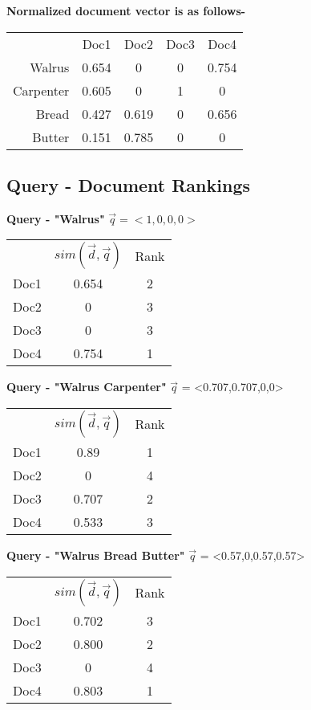 \documentclass{article}
\begin{document}
\vspace{5mm}
\textbf{Normalized document vector is as follows-}

\begin{tabular}{ r|c|c|c|c| }
\multicolumn{1}{r}{}
 & \multicolumn{1}{c}{Doc1}
 & \multicolumn{1}{c}{Doc2}
 & \multicolumn{1}{c}{Doc3}
 & \multicolumn{1}{c}{Doc4} \\
\cline{2-5}
Walrus & 0.654 & 0 & 0 & 0.754 \\
\cline{2-5}
Carpenter & 0.605 & 0 & 1 & 0 \\
\cline{2-5}
Bread & 0.427 & 0.619 & 0 & 0.656 \\
\cline{2-5}
Butter & 0.151 & 0.785 & 0 & 0 \\
\cline{2-5}
\end{tabular}

\subsection{Query - Document Rankings}

\vspace{5mm}
\textbf{Query - "Walrus"}
$\vec{q} = <1,0,0,0>$
\begin{tabular}{ r|c|c| }
\multicolumn{1}{r}{}
 & \multicolumn{1}{c}{$sim(\vec{d},\vec{q})$}
 & \multicolumn{1}{c}{Rank} \\
\cline{2-3}
Doc1 & 0.654 & 2 \\
\cline{2-3}
Doc2 & 0 & 3 \\
\cline{2-3}
Doc3 & 0 & 3 \\
\cline{2-3}
Doc4 & 0.754 & 1 \\
\cline{2-3}
\end{tabular}

\vspace{5mm}
\textbf{Query - "Walrus Carpenter"}
$\vec{q}$ = <0.707,0.707,0,0>
\begin{tabular}{ r|c|c| }
\multicolumn{1}{r}{}
 & \multicolumn{1}{c}{$sim(\vec{d},\vec{q})$}
 & \multicolumn{1}{c}{Rank} \\
\cline{2-3}
Doc1 & 0.89 & 1 \\
\cline{2-3}
Doc2 & 0 & 4 \\
\cline{2-3}
Doc3 & 0.707 & 2 \\
\cline{2-3}
Doc4 & 0.533 & 3 \\
\cline{2-3}
\end{tabular}

\vspace{5mm}
\textbf{Query - "Walrus Bread Butter"}
$\vec{q}$ = <0.57,0,0.57,0.57>
\begin{tabular}{ r|c|c| }
\multicolumn{1}{r}{}
 & \multicolumn{1}{c}{$sim(\vec{d},\vec{q})$}
 & \multicolumn{1}{c}{Rank} \\
\cline{2-3}
Doc1 & 0.702 & 3 \\
\cline{2-3}
Doc2 & 0.800 & 2 \\
\cline{2-3}
Doc3 & 0 & 4 \\
\cline{2-3}
Doc4 & 0.803 & 1 \\
\cline{2-3}
\end{tabular}
\end{document}
